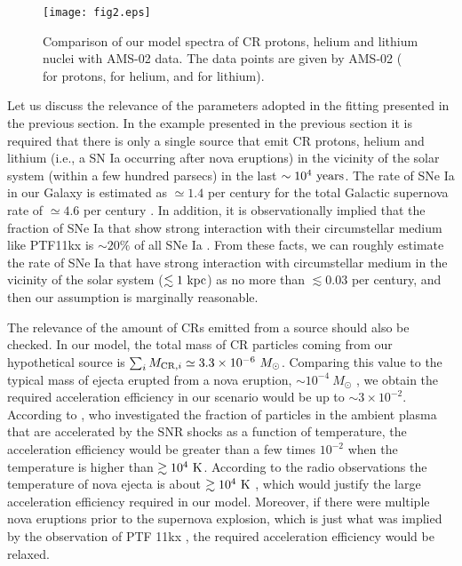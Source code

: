 \documentclass[twocolumn,showpacs,amsmath,amssymb]{revtex4-1}
\begin{document}
\begin{figure}[t]
\begin{center}
\texttt{[image: fig2.eps]}
\caption{Comparison of our model spectra of CR protons, helium and lithium nuclei with AMS-02 data.  The data points are given by AMS-02 (\cite{2015PhRvL.114q1103A} for protons, \cite{2015PhRvL.115u1101A} for helium, and \cite{ting16} for lithium).
}
\label{fig2}
\end{center}
\end{figure}

Let us discuss the relevance of the parameters adopted in the fitting presented in the previous section.  In the example presented in the previous section it is required that there is only a single source that emit CR protons, helium and lithium (i.e., a SN Ia occurring after nova eruptions) in the vicinity of the solar system (within a few hundred parsecs) in the last $\sim 10^4~{\rm years}$.  The rate of SNe Ia in our Galaxy is estimated as $\simeq 1.4$ per century for the total Galactic supernova rate of $\simeq 4.6$ per century \cite{2013ApJ...778..164A}.  In addition, it is observationally implied that the fraction of SNe Ia that show strong interaction with their circumstellar medium like PTF11kx is $\sim 20\%$ of all SNe Ia \cite{2013MNRAS.436..222M}.  From these facts, we can roughly estimate the rate of SNe Ia that have strong interaction with circumstellar medium in the vicinity of the solar system ($\lesssim 1~{\rm kpc}$) as no more than $\lesssim 0.03$ per century, and then our assumption is marginally reasonable.

The relevance of the amount of CRs emitted from a source should also be checked.  In our model, the total mass of CR particles coming from our hypothetical source is $\sum_i{M_{{\rm CR},i}}\simeq 3.3\times 10^{-6}~M_{\odot}$.  Comparing this value to the typical mass of ejecta erupted from a nova eruption, $\sim 10^{-4}~M_{\odot}$ \cite{seaquistbode08}, we obtain the required acceleration efficiency in our scenario would be up to $\sim 3\times 10^{-2}$.  According to \cite{2016AdSpR..57..519E}, who investigated the fraction of particles in the ambient plasma that are accelerated by the SNR shocks as a function of temperature, the acceleration efficiency would be greater than a few times $10^{-2}$ when the temperature is higher than $\gtrsim 10^4~{\rm K}$.  According to the radio observations the temperature of nova ejecta is about $\gtrsim 10^4~{\rm K}$ \cite{1979AJ.....84.1619H, 2014MNRAS.442..713M}, which would justify the large acceleration efficiency required in our model.  Moreover, if there were multiple nova eruptions prior to the supernova explosion, which is just what was implied by the observation of PTF 11kx \cite{2012Sci...337..942D}, the required acceleration efficiency would be relaxed.
\end{document}
